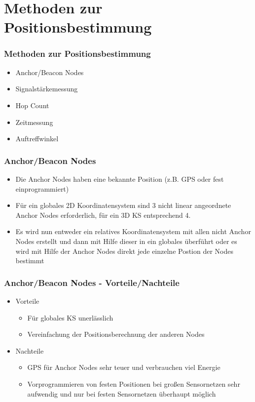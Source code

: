 \section{Methoden zur Positionsbestimmung}
\label{sec:methoden}

\begin{frame}
\begin{center}
\end{center}
\end{frame}

\begin{frame}
\frametitle{Methoden zur Positionsbestimmung}

\begin{itemize}
   \item Anchor/Beacon Nodes
   \item Signalstärkemessung
   \item Hop Count
   \item Zeitmessung
   \item Auftreffwinkel
\end{itemize}

\end{frame}

\begin{frame}
\frametitle{Anchor/Beacon Nodes}

\begin{itemize}
  \item Die Anchor Nodes haben eine bekannte Position (z.B. GPS oder fest einprogrammiert)
  \item Für ein globales 2D Koordinatensystem sind 3 nicht linear angeordnete Anchor Nodes erforderlich, für ein 3D KS entsprechend 4.
  \item Es wird nun entweder ein relatives Koordinatensystem mit allen nicht Anchor Nodes erstellt und dann mit Hilfe dieser in ein globales überführt oder es wird mit Hilfe der Anchor Nodes direkt jede einzelne Postion der Nodes bestimmt
\end{itemize}
\end{frame}

\begin{frame}
\frametitle{Anchor/Beacon Nodes - Vorteile/Nachteile}

\begin{itemize}
  \item Vorteile
  \begin{itemize}
    \item Für globales KS unerlässlich
    \item Vereinfachung der Positionsberechnung der anderen Nodes
  \end{itemize}
  \item Nachteile
  \begin{itemize}
    \item GPS für Anchor Nodes sehr teuer und verbrauchen viel Energie
    \item Vorprogrammieren von festen Positionen bei großen Sensornetzen sehr aufwendig und nur bei festen Sensornetzen überhaupt möglich
  \end{itemize}
\end{itemize}
\end{frame}

